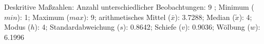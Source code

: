 				\label{tableValues:bsch16b}
				\vspace*{-\baselineskip}
                    \begin{noten}
                	    \note{} Deskritive Maßzahlen:
                	    Anzahl unterschiedlicher Beobachtungen: 9%
                	    ; 
                	      Minimum ($min$): 1; 
                	      Maximum ($max$): 9; 
                	      arithmetisches Mittel ($\bar{x}$): \num[round-mode=places,round-precision=2]{3,7288}; 
                	      Median ($\tilde{x}$): 4; 
                	      Modus ($h$): 4; 
                	      Standardabweichung ($s$): \num[round-mode=places,round-precision=2]{0,8642}; 
                	      Schiefe ($v$): \num[round-mode=places,round-precision=2]{0,9036}; 
                	      Wölbung ($w$): \num[round-mode=places,round-precision=2]{6,1996}
                     \end{noten}


